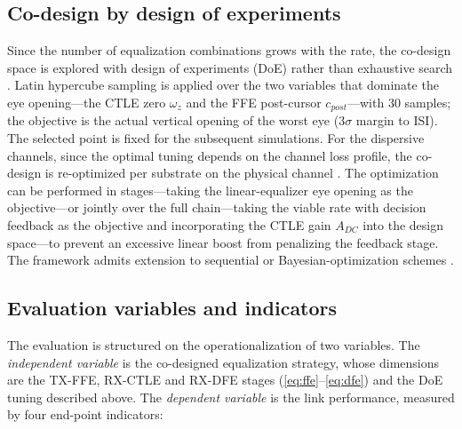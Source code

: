 \documentclass{ieeeaccess}
\begin{document}
\subsection{Co-design by design of experiments}
Since the number of equalization combinations grows with the rate, the
co-design space is explored with design of experiments (DoE) rather than
exhaustive search \cite{7851249,5770781}. Latin hypercube sampling is
applied over the two variables that dominate the eye opening---the CTLE zero
$\omega_z$ and the FFE post-cursor $c_{post}$---with 30 samples; the
objective is the actual vertical opening of the worst eye ($3\sigma$ margin
to ISI). The selected point is fixed for the subsequent simulations. For the
dispersive channels, since the optimal tuning depends on the channel loss
profile, the co-design is re-optimized per substrate on the physical channel
\cite{11169790}. The optimization can be performed in stages---taking the
linear-equalizer eye opening as the objective---or jointly over the full
chain---taking the viable rate with decision feedback as the objective and
incorporating the CTLE gain $A_{DC}$ into the design space---to prevent an
excessive linear boost from penalizing the feedback stage. The framework
admits extension to sequential or Bayesian-optimization schemes
\cite{11309336}.

\subsection{Evaluation variables and indicators}
The evaluation is structured on the operationalization of two variables. The
\emph{independent variable} is the co-designed equalization strategy, whose
dimensions are the TX-FFE, RX-CTLE and RX-DFE stages
(\eqref{eq:ffe}--\eqref{eq:dfe}) and the DoE tuning described above. The
\emph{dependent variable} is the link performance, measured by four
end-point indicators:
\end{document}
